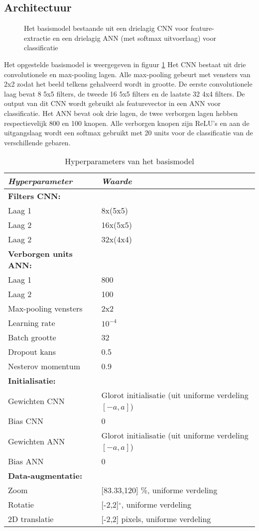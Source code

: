 \subsection{Architectuur}
\begin{figure}
	\centering
	\def\svgwidth{\columnwidth}
	
	\caption{Het basismodel bestaande uit een drielagig CNN voor feature-extractie en een drielagig ANN (met softmax uitvoerlaag) voor classificatie}
	\label{fig:model-1}
\end{figure}
Het opgestelde basismodel is weergegeven in figuur \ref{fig:model-1}
Het CNN bestaat uit drie convolutionele en max-pooling lagen. Alle max-pooling gebeurt met vensters van 2x2 zodat het beeld telkens gehalveerd wordt in grootte. De eerste convolutionele laag bevat 8 5x5 filters, de tweede 16 5x5 filters en de laatste 32 4x4 filters.
\npar De output van dit CNN wordt gebruikt als featurevector in een ANN voor classificatie. Het ANN bevat ook drie lagen, de twee verborgen lagen hebben respectievelijk 800 en 100 knopen. Alle verborgen knopen zijn ReLU's en aan de uitgangslaag wordt een softmax gebruikt met 20 units voor de classificatie van de verschillende gebaren.
\begin{table}
	\centering
	\renewcommand{\arraystretch}{0.8}%
	\begin{tabular}{ l l }
		\hline
		\textit{Hyperparameter} & \textit{Waarde} \\
		\hline
		\hline
		\textbf{Filters CNN:} & \\
		\quad Laag 1 & 8x(5x5) \\
		\quad Laag 2 & 16x(5x5) \\
		\quad Laag 2 & 32x(4x4) \\
		
		\textbf{Verborgen units ANN:} &\\
		\quad Laag 1 & 800\\
		\quad Laag 2 & 100 \\
		\hline
		Max-pooling vensters & 2x2\\
		Learning rate & $10^{-4}$\\
		Batch grootte & 32\\
		Dropout kans & 0.5\\
		Nesterov momentum & 0.9\\
		\hline
		\textbf{Initialisatie:} & \\
		Gewichten CNN & Glorot initialisatie (uit uniforme verdeling $[-a,a]$)\\
		Bias CNN & 0 \\
		Gewichten ANN & Glorot initialisatie (uit uniforme verdeling $[-a,a]$)\\
		Bias ANN & 0 \\
		\hline
		\textbf{Data-augmentatie:} & \\
		Zoom & [83.33,120] \%, uniforme verdeling \\
		Rotatie & [-2,2]$^{\circ}$, uniforme verdeling\\
		2D translatie & [-2,2] pixels, uniforme verdeling
		
	\end{tabular}	
	\caption{Hyperparameters van het basismodel}\label{tab:hyperparam}
\end{table}
